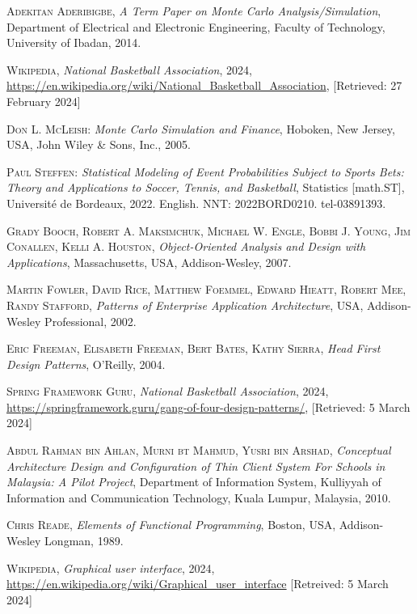 \documentclass{thesis-ekf}
\theoremstyle{definition}
\theoremstyle{remark}
\begin{document}
{\begin{thebibliography}{2}
\textsc{Adekitan Aderibigbe},
\emph{A Term Paper on Monte Carlo Analysis/Simulation},
Department of Electrical and Electronic Engineering,
Faculty of Technology, University of Ibadan,
2014.

\textsc{Wikipedia},
\emph{National Basketball Association}, 2024, 
\url{https://en.wikipedia.org/wiki/National_Basketball_Association}, [Retrieved: 27 February 2024]

\textsc{Don L. McLeish}: 
\emph{Monte Carlo Simulation and Finance}, 
Hoboken, New Jersey, USA, John Wiley \& Sons, Inc., 2005.

\textsc{Paul Steffen}:
\emph{Statistical Modeling of Event Probabilities Subject to Sports Bets: Theory and Applications to Soccer, Tennis, and Basketball},
Statistics [math.ST], Université de Bordeaux, 2022.
English.
NNT: 2022BORD0210.
tel-03891393.

\textsc{Grady Booch, Robert A. Maksimchuk, Michael W. Engle, Bobbi J. Young, Jim Conallen, Kelli A. Houston},
\emph{Object-Oriented Analysis and Design with Applications}, 
Massachusetts, USA, Addison-Wesley, 2007.

\textsc{Martin Fowler, David Rice, Matthew Foemmel, Edward Hieatt, Robert Mee, Randy Stafford},
\emph{Patterns of Enterprise Application Architecture},
USA, Addison-Wesley Professional, 2002.

\textsc{Eric Freeman, Elisabeth Freeman, Bert Bates, Kathy Sierra},
\emph{Head First Design Patterns},
O'Reilly, 2004.

\textsc{Spring Framework Guru},
\emph{National Basketball Association}, 2024, 
\url{https://springframework.guru/gang-of-four-design-patterns/}, [Retrieved: 5 March 2024]

\textsc{Abdul Rahman bin Ahlan, Murni bt Mahmud, Yusri bin Arshad},
\emph{Conceptual Architecture Design and Configuration of Thin Client System For Schools in Malaysia: A Pilot Project}, 
Department of Information System, Kulliyyah of Information and Communication Technology,
Kuala Lumpur, Malaysia, 2010.

\textsc{Chris Reade},
\emph{Elements of Functional Programming}, 
Boston, USA, Addison-Wesley Longman, 1989.

\textsc{Wikipedia},
\emph{Graphical user interface}, 2024,
\url{https://en.wikipedia.org/wiki/Graphical_user_interface} [Retreived: 5 March 2024]


\end{thebibliography}}
\end{document}
